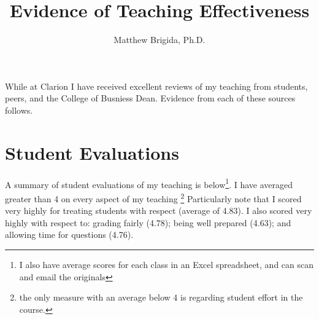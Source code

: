\documentclass[12pt]{article}
\title{Evidence of Teaching Effectiveness}
\author{Matthew Brigida, Ph.D.}
\date{}
\begin{document}
\maketitle

While at Clarion I have received excellent reviews of my teaching from students, peers, and the College of Busniess Dean.  Evidence from each of these sources follows.

\section{Student Evaluations}

A summary of student evaluations of my teaching is below\footnote{I also have average scores for each class in an Excel spreadsheet, and can scan and email the originals}.  I have averaged greater than 4 on every aspect of my teaching \footnote{the only measure with an average below 4 is regarding student effort in the course.} Particularly note that I scored very highly for treating students with respect (average of 4.83).  I also scored very highly with respect to: grading fairly (4.78); being well prepared (4.63); and allowing time for questions (4.76).
\end{document}
